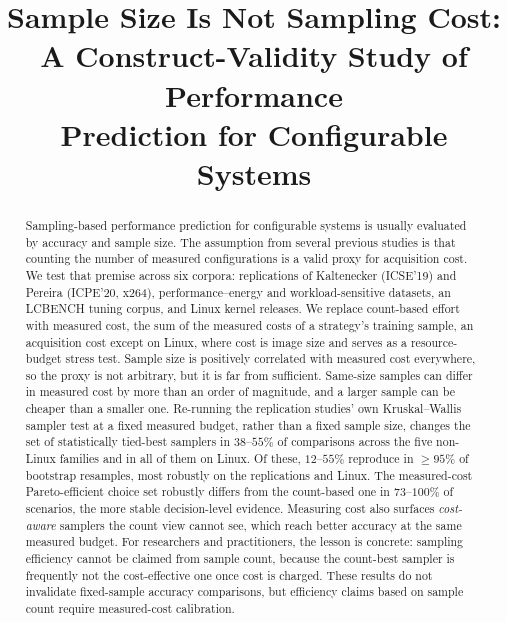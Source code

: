 \documentclass[10pt,conference]{IEEEtran}
\newcommand{\StudyLCBench}{LCBENCH\xspace}
\begin{document}
\title{Sample Size Is Not Sampling Cost:\\A Construct-Validity Study of Performance\\ Prediction for Configurable Systems}

\author{}

\maketitle

\begin{abstract}
Sampling-based performance prediction for configurable systems is usually
evaluated by accuracy and sample size. The assumption from several previous studies is that counting the number
of measured configurations is a valid proxy for acquisition cost. We test that
premise across six corpora: replications of Kaltenecker (ICSE'19) and Pereira
(ICPE'20, x264), performance--energy and workload-sensitive datasets, an
\StudyLCBench tuning corpus, and Linux kernel releases. We replace count-based
effort with measured cost, the sum of the measured costs of a strategy's training
sample, an acquisition cost except on Linux, where cost is image size and serves
as a resource-budget stress test.
Sample size is positively correlated with measured cost everywhere, so the proxy
is not arbitrary, but it is far from sufficient. Same-size samples can differ in
measured cost by more than an order of magnitude, and a larger sample can be
cheaper than a smaller one. Re-running the replication studies' own
Kruskal--Wallis sampler test at a fixed measured budget, rather than a fixed
sample size, changes the set of statistically tied-best samplers in $38$--$55\%$
of comparisons across the five non-Linux families and in all of them on Linux. Of
these, $12$--$55\%$ reproduce in $\ge95\%$ of bootstrap resamples, most robustly on
the replications and Linux. The measured-cost Pareto-efficient choice set robustly
differs from the count-based one in $73$--$100\%$ of scenarios, the more stable
decision-level evidence. Measuring cost also surfaces \emph{cost-aware}
samplers the count view cannot see, which reach better accuracy at the same
measured budget. For researchers and practitioners, the lesson is concrete:
sampling efficiency cannot be claimed from sample count, because the count-best
sampler is frequently not the cost-effective one once cost is charged. These
results do not invalidate fixed-sample accuracy comparisons, but efficiency claims
based on sample count require measured-cost calibration.
\end{abstract}
\end{document}
